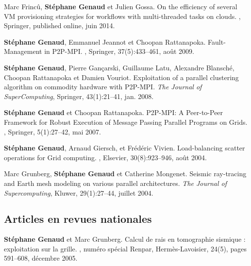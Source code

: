 \documentclass[11pt]{article}
\begin{document}
\begin{thebibliography}{99}
\newblock Marc Frincû, \textbf{Stéphane Genaud} et Julien Gossa.
\newblock On the efficiency of several VM provisioning strategies for workflows
with multi-threaded tasks on clouds.
, Springer, published online, juin 2014.



\newblock \textbf{Stéphane Genaud}, Emmanuel Jeannot et Choopan Rattanapoka.
\newblock Fault-Management in P2P-MPI.
, Springer, 
37(5):433--461, août 2009.


\textbf{Stéphane Genaud}, Pierre Gançarski, Guillaume Latu, Alexandre Blansché, 
Choopan Rattanapoka et Damien Vouriot. \newblock Exploitation of a parallel 
clustering algorithm on commodity hardware with P2P-MPI.
\newblock 
{\em The Journal of SuperComputing}, Springer, 43(1):21--41, jan. 2008.


\textbf{Stéphane Genaud} et Choopan Rattanapoka.
\newblock P2P-MPI: A Peer-to-Peer Framework for Robust Execution of Message 
Passing Parallel Programs on Grids.
, Springer, 5(1):27--42, mai 2007.


\textbf{Stéphane Genaud}, Arnaud Giersch, et Frédéric Vivien.
\newblock Load-balancing scatter operations for Grid computing.
, Elsevier, 30(8):923--946, août 2004.

Marc Grunberg, \textbf{Stéphane Genaud} et Catherine Mongenet.
\newblock Seismic ray-tracing and Earth mesh modeling on various parallel
  architectures.
\newblock 
{\em The Journal of Supercomputing}, Kluwer, 29(1):27--44, juillet 2004.


\subsection*{Articles en revues nationales}
\textbf{Stéphane Genaud} et Marc Grunberg. 
\newblock  Calcul de rais en tomographie sismique : exploitation sur la grille.
, numéro spécial Renpar, 
Hermès-Lavoisier, 24(5), pages 591--608, décembre 2005.


\end{thebibliography}
\end{document}
